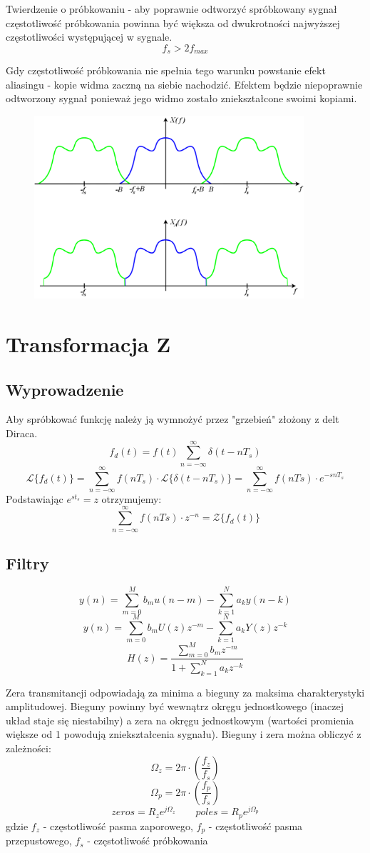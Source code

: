 \documentclass[11pt]{article}
\begin{document}
Twierdzenie o próbkowaniu - aby poprawnie odtworzyć spróbkowany sygnał częstotliwość próbkowania powinna być większa od dwukrotności najwyższej częstotliwości występującej w sygnale.
\[ f_s > 2f_{max} \]

Gdy częstotliwość próbkowania nie spełnia tego warunku powstanie efekt aliasingu - kopie widma zaczną na siebie nachodzić. Efektem będzie niepoprawnie odtworzony sygnał ponieważ jego widmo zostało zniekształcone swoimi kopiami.
\begin{figure}[h]
    \centering
    \includegraphics[width=10cm]{aliasing.png}
\end{figure}

\section{Transformacja Z}
\subsection{Wyprowadzenie}
Aby spróbkować funkcję należy ją wymnożyć przez "grzebień" złożony z delt Diraca.
\[ f_d(t) = f(t)\sum_{n=-\infty}^{\infty}\delta (t-nT_s) \]
\[ \mathcal{L} \{f_d(t)\}=\sum_{n=-\infty}^{\infty}f(nT_s) \cdot \mathcal{L} \{\delta (t-nT_s)\} =\sum_{n=-\infty}^{\infty} f(nTs)\cdot e^{-snT_s} \]
Podstawiając $ e^{st_s} = z $ otrzymujemy:
\[ \sum_{n=-\infty}^{\infty} f(nTs)\cdot z^{-n} = \mathcal{Z} \{ f_d(t) \} \]
\subsection{Filtry}
\[ y(n) = \sum_{m=0}^{M}b_m u(n-m) - \sum_{k=1}^{N}a_k y(n-k) \]
\[ y(n) = \sum_{m=0}^{M}b_m U(z)z^{-m} - \sum_{k=1}^{N}a_k Y(z)z^{-k} \]
\[ H(z) = \frac{\sum_{m=0}^{M}b_m z^{-m}}{1 + \sum_{k=1}^{N}a_k z^{-k}} \]

Zera transmitancji odpowiadają za minima a bieguny za maksima charakterystyki amplitudowej. Bieguny powinny być wewnątrz okręgu jednostkowego (inaczej układ staje się niestabilny) a zera na okręgu jednostkowym (wartości promienia większe od 1 powodują zniekształcenia sygnału). Bieguny i zera można obliczyć z zależności:
\[ \Omega_z = 2\pi \cdot \left( \frac{f_z}{f_s} \right) \]
\[ \Omega_p = 2\pi \cdot \left( \frac{f_p}{f_s} \right) \]
\[ zeros = R_z e^{j\Omega_z} \quad\quad poles = R_p e^{j\Omega_p} \]
gdzie $ f_z $ - częstotliwość pasma zaporowego, $ f_p $ - częstotliwość pasma przepustowego, $ f_s $ - częstotliwość próbkowania
\end{document}
